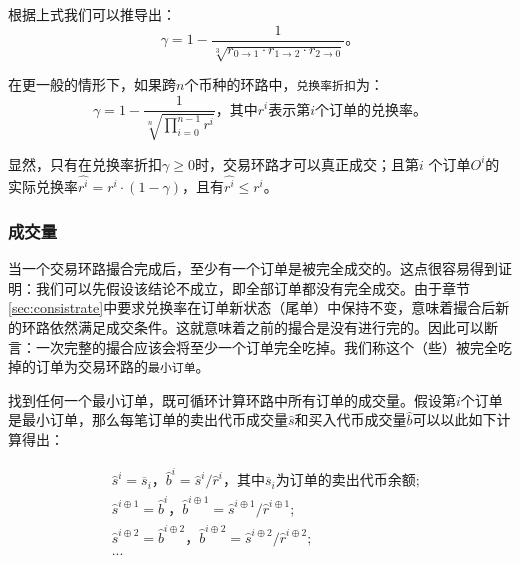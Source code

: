 \documentclass[UTF8,nofonts]{ctexart}
\begin{document}
根据上式我们可以推导出：
\begin{equation*}
\gamma = 1- \frac{1}{\sqrt[3]{r_{0\rightarrow 1} \cdot r_{1\rightarrow 2} \cdot r_{2\rightarrow 0}}}\text{。}
\end{equation*}

在更一般的情形下，如果跨$n$个币种的环路中，\texttt{兑换率折扣}为：
\begin{equation*}
\gamma = 1- \frac{1}{\sqrt[n]{\prod_{i=0}^{n-1} r^i}} \text{，其中} r^i \text{表示第}i\text{个订单的兑换率。}
\end{equation*}

显然，只有在兑换率折扣$\gamma \ge 0$时，交易环路才可以真正成交；且第$i$ 个订单$O^i$的实际兑换率$\hat{r^i} = r^i \cdot (1-\gamma)$，且有$\hat{r^i}\le r^i$。



\subsubsection{成交量\label{sec:matchquantity}}

当一个交易环路撮合完成后，至少有一个订单是被完全成交的。这点很容易得到证明：我们可以先假设该结论不成立，即全部订单都没有完全成交。由于章节\ref{sec:consistrate}中要求兑换率在订单新状态（尾单）中保持不变，意味着撮合后新的环路依然满足成交条件。这就意味着之前的撮合是没有进行完的。因此可以断言：一次完整的撮合应该会将至少一个订单完全吃掉。我们称这个（些）被完全吃掉的订单为交易环路的\texttt{最小订单}。

找到任何一个最小订单，既可循环计算环路中所有订单的成交量。假设第$i$个订单是最小订单，那么每笔订单的卖出代币成交量$\hat{s}$和买入代币成交量$\hat{b}$可以以此如下计算得出：

\[
\begin{split}
&\hat{s}^{i}=\overline{s}_i\text{，} \hat{b}^{i}=\hat{s}^{i} / \hat{r}^i \text{，其中}\overline{s}_i\text{为订单的卖出代币余额;}\\
&\hat{s}^{i\oplus 1}=\hat{b}^i\text{，} \hat{b}^{i\oplus 1}=\hat{s}^{i\oplus 1} / \hat{r}^{i\oplus 1}\text{;}\\
&\hat{s}^{i\oplus 2}=\hat{b}^{i\oplus 2}\text{，} \hat{b}^{i\oplus 2}=\hat{s}^{i\oplus 2} / \hat{r}^{i\oplus 2}\text{;}\\
& ...
\end{split}
\]
\end{document}
